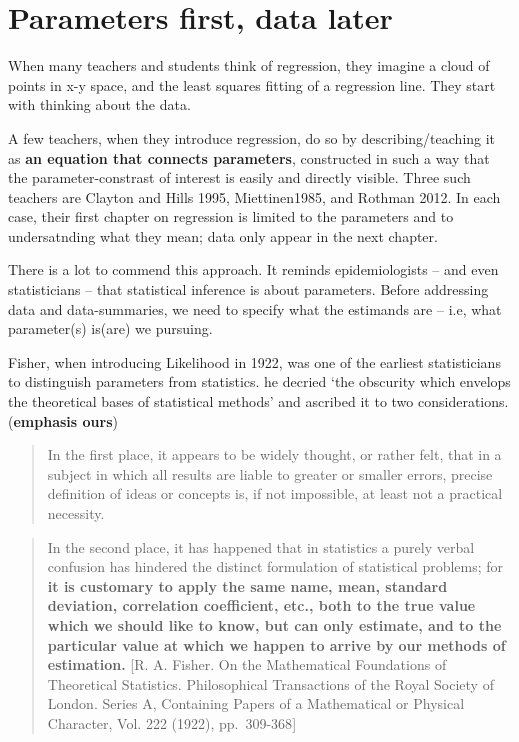 \documentclass[]{book}
\begin{document}
\hypertarget{parameters-first-data-later}{%
\section{Parameters first, data later}\label{parameters-first-data-later}}

When many teachers and students think of regression, they imagine a cloud of points in x-y space, and the least squares fitting of a regression line. They start with thinking about the data.

A few teachers, when they introduce regression, do so by describing/teaching it as \textbf{an equation that connects parameters}, constructed in such a way that the parameter-constrast of interest is easily and directly visible. Three such teachers are Clayton and Hills 1995, Miettinen1985, and Rothman 2012. In each case, their first chapter on regression is limited to the parameters and to undersatnding what they mean; data only appear in the next chapter.

There is a lot to commend this approach. It reminds epidemiologists -- and even statisticians -- that statistical inference is about parameters. Before addressing data and data-summaries, we need to specify what the estimands are -- i.e, what parameter(s) is(are) we pursuing.

Fisher, when introducing Likelihood in 1922, was one of the earliest statisticians to distinguish parameters from statistics. he decried `the obscurity which envelops the theoretical bases of statistical methods' and ascribed it to two considerations. (\textbf{emphasis ours})

\begin{quote}
In the first place, it appears to be widely thought, or rather felt, that in a subject in which all results are liable to greater or smaller errors, precise definition of ideas or concepts is, if not impossible, at least not a practical necessity.
\end{quote}

\begin{quote}
In the second place, it has happened that in statistics a purely verbal confusion has hindered the distinct formulation of statistical problems; for \textbf{it is customary to apply the same name, mean, standard deviation, correlation coefficient, etc., both to the true value which we should like to know, but can only estimate, and to the particular value at which we happen to arrive by our methods of estimation.} {[}R. A. Fisher. On the Mathematical Foundations of Theoretical Statistics. Philosophical Transactions of the Royal Society of London. Series A, Containing Papers of a Mathematical or Physical Character, Vol. 222 (1922), pp.~309-368{]}
\end{quote}
\end{document}
